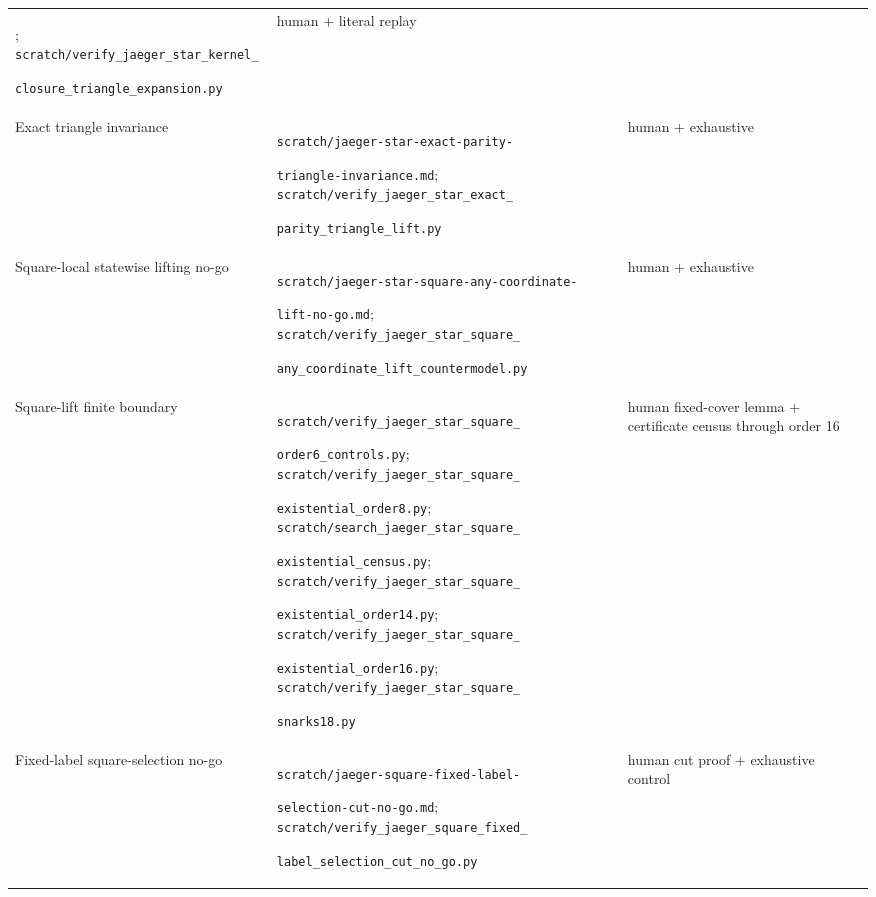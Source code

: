 \documentclass[11pt]{article}
\theoremstyle{definition}
\theoremstyle{remark}
\newcommand{\1}{\mathbf 1}
\begin{document}
\begin{longtable}{@{}
  >{\raggedright\arraybackslash}p{}
  >{\raggedright\arraybackslash}p{}
  >{\raggedright\arraybackslash}p{}@{}}
{\footnotesize\texttt{triangle-expansion.md}};
{\footnotesize\texttt{scratch/verify\_jaeger\_star\_kernel\_}}\par
{\footnotesize\texttt{closure\_triangle\_expansion.py}} &
human + literal replay\\
\addlinespace
Exact triangle invariance &
{\footnotesize\texttt{scratch/jaeger-star-exact-parity-}}\par
{\footnotesize\texttt{triangle-invariance.md}};
{\footnotesize\texttt{scratch/verify\_jaeger\_star\_exact\_}}\par
{\footnotesize\texttt{parity\_triangle\_lift.py}} &
human + exhaustive\\
\addlinespace
Square-local statewise lifting no-go &
{\footnotesize\texttt{scratch/jaeger-star-square-any-coordinate-}}\par
{\footnotesize\texttt{lift-no-go.md}};
{\footnotesize\texttt{scratch/verify\_jaeger\_star\_square\_}}\par
{\footnotesize\texttt{any\_coordinate\_lift\_countermodel.py}} &
human + exhaustive\\
\addlinespace
Square-lift finite boundary &
{\footnotesize\texttt{scratch/verify\_jaeger\_star\_square\_}}\par
{\footnotesize\texttt{order6\_controls.py}};
{\footnotesize\texttt{scratch/verify\_jaeger\_star\_square\_}}\par
{\footnotesize\texttt{existential\_order8.py}};
{\footnotesize\texttt{scratch/search\_jaeger\_star\_square\_}}\par
{\footnotesize\texttt{existential\_census.py}};
{\footnotesize\texttt{scratch/verify\_jaeger\_star\_square\_}}\par
{\footnotesize\texttt{existential\_order14.py}};
{\footnotesize\texttt{scratch/verify\_jaeger\_star\_square\_}}\par
{\footnotesize\texttt{existential\_order16.py}};
{\footnotesize\texttt{scratch/verify\_jaeger\_star\_square\_}}\par
{\footnotesize\texttt{snarks18.py}} &
human fixed-cover lemma + certificate census through order 16\\
\addlinespace
Fixed-label square-selection no-go &
{\footnotesize\texttt{scratch/jaeger-square-fixed-label-}}\par
{\footnotesize\texttt{selection-cut-no-go.md}};
{\footnotesize\texttt{scratch/verify\_jaeger\_square\_fixed\_}}\par
{\footnotesize\texttt{label\_selection\_cut\_no\_go.py}} &
human cut proof + exhaustive control\\

\end{longtable}
\end{document}
